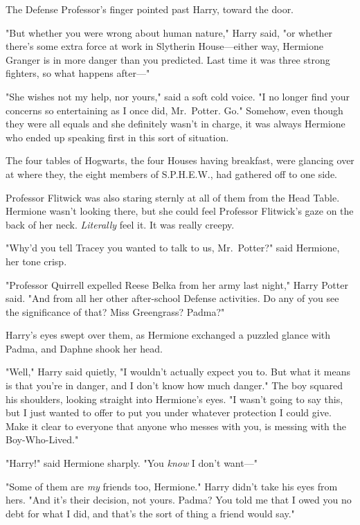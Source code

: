 The Defense Professor's finger pointed past Harry, toward the door.

"But whether you were wrong about human nature," Harry said, "or whether
there's some extra force at work in Slytherin House---either way, Hermione
Granger is in more danger than you predicted. Last time it was three strong
fighters, so what happens after\mbox{---}"

"She wishes not my help, nor yours," said a soft cold voice. "I no longer find
your concerns so entertaining as I once did, Mr.~Potter. Go."
\sbreak
Somehow, even though they were all equals and she definitely wasn't in charge,
it was always Hermione who ended up speaking first in this sort of situation.

The four tables of Hogwarts, the four Houses having breakfast, were glancing
over at where they, the eight members of S.P.H.E.W., had gathered off to one
side.

Professor Flitwick was also staring sternly at all of them from the Head Table.
Hermione wasn't looking there, but she could feel Professor Flitwick's gaze on
the back of her neck. \emph{Literally} feel it. It was really creepy.

"Why'd you tell Tracey you wanted to talk to us, Mr.~Potter?" said Hermione,
her tone crisp.

"Professor Quirrell expelled Reese Belka from her army last night," Harry
Potter said. "And from all her other after-school Defense activities. Do any of
you see the significance of that? Miss Greengrass? Padma?"

Harry's eyes swept over them, as Hermione exchanged a puzzled glance with
Padma, and Daphne shook her head.

"Well," Harry said quietly, "I wouldn't actually expect you to. But what it
means is that you're in danger, and I don't know how much danger." The boy
squared his shoulders, looking straight into Hermione's eyes. "I wasn't going
to say this, but{\el} I just wanted to offer to put you under whatever
protection I could give. Make it clear to everyone that anyone who messes with
you, is messing with the Boy-Who-Lived."

"Harry!" said Hermione sharply. "You \emph{know} I don't want\mbox{---}"

"Some of them are \emph{my} friends too, Hermione." Harry didn't take his eyes
from hers. "And it's their decision, not yours. Padma? You told me that I owed
you no debt for what I did, and that's the sort of thing a friend would say."

